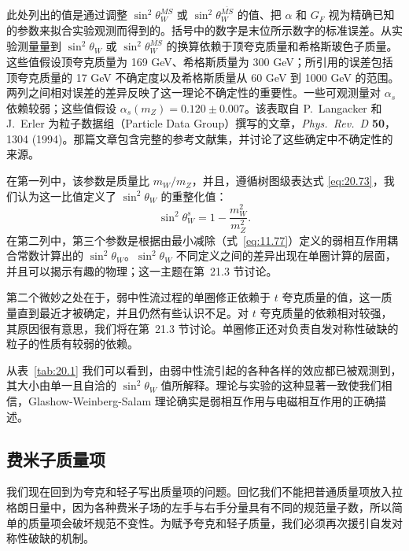 此处列出的值是通过调整 $\sin^2\theta^{MS}_W$ 或 $\sin^2\theta^{\overline{MS}}_W$ 的值、把 $\alpha$ 和 $G_F$ 视为精确已知的参数来拟合实验观测而得到的。括号中的数字是末位所示数字的标准误差。从实验测量量到 $\sin^2\theta_W$ 或 $\sin^2\theta^{\overline{MS}}_W$ 的换算依赖于顶夸克质量和希格斯玻色子质量。这些值假设顶夸克质量为 169 GeV、希格斯质量为 300 GeV；所引用的误差包括顶夸克质量的 17 GeV 不确定度以及希格斯质量从 60 GeV 到 1000 GeV 的范围。两列之间相对误差的差异反映了这一理论不确定性的重要性。一些可观测量对 $\alpha_s$ 依赖较弱；这些值假设 $\alpha_s(m_Z) = 0.120 \pm 0.007$。该表取自 P.~Langacker 和 J.~Erler 为粒子数据组（Particle Data Group）撰写的文章，\emph{Phys.\ Rev.\ D} \textbf{50}，1304 (1994)。那篇文章包含完整的参考文献集，并讨论了这些确定中不确定性的来源。

在第一列中，该参数是质量比 $m_W/m_Z$，并且，遵循树图级表达式 \eqref{eq:20.73}，我们认为这一比值定义了 $\sin^2\theta_W$ 的重整化值：
\begin{equation}
  \sin^2\theta^s_W = 1 - \frac{m_W^2}{m_Z^2} .
  \label{eq:20.97}
\end{equation}
在第二列中，第三个参数是根据由最小减除（式~\eqref{eq:11.77}）定义的弱相互作用耦合常数计算出的 $\sin^2\theta_W$。$\sin^2\theta_W$ 不同定义之间的差异出现在单圈计算的层面，并且可以揭示有趣的物理；这一主题在第~21.3 节讨论。

第二个微妙之处在于，弱中性流过程的单圈修正依赖于 $t$ 夸克质量的值，这一质量直到最近才被确定，并且仍然有些认识不足。对 $t$ 夸克质量的依赖相对较强，其原因很有意思，我们将在第~21.3 节讨论。单圈修正还对负责自发对称性破缺的粒子的性质有较弱的依赖。

从表~\ref{tab:20.1} 我们可以看到，由弱中性流引起的各种各样的效应都已被观测到，其大小由单一且自洽的 $\sin^2\theta_W$ 值所解释。理论与实验的这种显著一致使我们相信，Glashow-Weinberg-Salam 理论确实是弱相互作用与电磁相互作用的正确描述。

\subsection{费米子质量项}

我们现在回到为夸克和轻子写出质量项的问题。回忆我们不能把普通质量项放入拉格朗日量中，因为各种费米子场的左手与右手分量具有不同的规范量子数，所以简单的质量项会破坏规范不变性。为赋予夸克和轻子质量，我们必须再次援引自发对称性破缺的机制。

